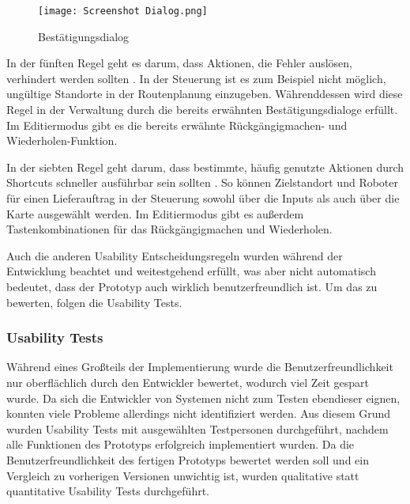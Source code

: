 \begin{figure}[H]
    \caption{Bestätigungsdialog}\label{fig:DialogScreenshot}
    \texttt{[image: Screenshot Dialog.png]}
\end{figure}

In der fünften Regel geht es darum, dass Aktionen, die Fehler auslösen, verhindert werden sollten \cite[Regel 5]{Nielsen.1994}. In der Steuerung ist es zum Beispiel nicht möglich, ungültige Standorte in der Routenplanung einzugeben. Währenddessen wird diese Regel in der Verwaltung durch die bereits erwähnten Bestätigungsdialoge erfüllt. Im Editiermodus gibt es die bereits erwähnte Rückgängigmachen- und Wiederholen-Funktion.

In der siebten Regel geht darum, dass bestimmte, häufig genutzte Aktionen durch Shortcuts schneller ausführbar sein sollten \cite[Regel 7]{Nielsen.1994}. So können Zielstandort und Roboter für einen Lieferauftrag in der Steuerung sowohl über die Inputs als auch über die Karte ausgewählt werden. Im Editiermodus gibt es außerdem Tastenkombinationen für das Rückgängigmachen und Wiederholen.

Auch die anderen Usability Entscheidungsregeln wurden während der Entwicklung beachtet und weitestgehend erfüllt, was aber nicht automatisch bedeutet, dass der Prototyp auch wirklich benutzerfreundlich ist. Um das zu bewerten, folgen die Usability Tests.

\subsubsection{Usability Tests}\label{sec:UsabilityTests}
Während eines Großteils der Implementierung wurde die Benutzerfreundlichkeit nur oberflächlich durch den Entwickler bewertet, wodurch viel Zeit gespart wurde. Da sich die Entwickler von Systemen nicht zum Testen ebendieser eignen, konnten viele Probleme allerdings nicht identifiziert werden. Aus diesem Grund wurden Usability Tests mit ausgewählten Testpersonen durchgeführt, nachdem alle Funktionen des Prototyps erfolgreich implementiert wurden. Da die Benutzerfreundlichkeit des fertigen Prototyps bewertet werden soll und ein Vergleich zu vorherigen Versionen unwichtig ist, wurden qualitative statt quantitative Usability Tests durchgeführt.

